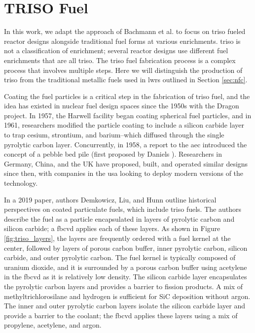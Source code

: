 \section{TRISO Fuel}
\label{sec:triso_fuel}

In this work, we adapt the approach of Bachmann et al.
\cite{bachmann_enrichment_2021} to focus on \gls{triso} fueled reactor designs
alongside traditional fuel forms at various enrichments. \gls{triso} is not a
classification of enrichment; several reactor designs use different fuel
enrichments that are all \gls{triso}. The \gls{triso} fuel fabrication process
is a complex process that involves multiple steps. Here we will distinguish the
production of \gls{triso} from the traditional metallic fuels used in
\glspl{lwr} outlined in Section \ref{sec:nfc}.

Coating the fuel particles is a critical step in the fabrication of \gls{triso}
fuel, and the idea has existed in nuclear fuel design spaces since the 1950s
\cite{price_dragon_2012} with the Dragon project. In 1957, the Harwell facility
began coating spherical fuel particles, and in 1961, researchers modified the
particle coating to include a silicon carbide layer to trap cesium, strontium,
and barium--which diffused through the single pyrolytic carbon layer.
Concurrently, in 1958, a report to the \gls{aec} introduced the concept of a
pebble bed pile (first proposed by Daniels
\cite{f_b_daniels_suggestions_1944}). Researchers in Germany, China, and the UK
have proposed, built, and operated similar designs since then, with companies
in the \gls{usa} looking to deploy modern versions of the technology.

In a 2019 paper, authors Demkowicz, Liu, and Hunn \cite{particle_review_2019}
outline historical perspectives on coated particulate fuels, which include
\gls{triso} fuels. The authors describe the fuel as a particle encapsulated in
layers of pyrolytic carbon and silicon carbide; a \gls{fbcvd} applies each of
these layers. As shown in Figure \ref{fig:triso_layers}, the layers are
frequently ordered with a fuel kernel at the center, followed by layers of
porous carbon buffer, inner pyrolytic carbon, silicon carbide, and outer
pyrolytic carbon. The fuel kernel is typically composed of uranium dioxide, and
it is surrounded by a porous carbon buffer using acetylene in the \gls{fbcvd}
as it is relatively low density. The silicon carbide layer encapsulates the
pyrolytic carbon layers and provides a barrier to fission products. A mix of
methyltrichlorosilane and hydrogen is sufficient for SiC deposition without
argon. The inner and outer pyrolytic carbon layers isolate the silicon carbide
layer and provide a barrier to the coolant; the \gls{fbcvd} applies these
layers using a mix of propylene, acetylene, and argon.

